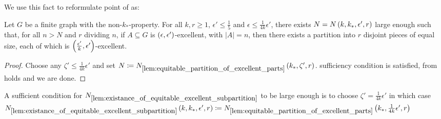     We use this fact to reformulate point  of
     as:

    \begin{lemma}[Claim 5.13.2(3)] \label{lem:existance_of_equitable_excellent_subpartition}
        Let $G$ be a finite graph with the non-$k_*$-property.
        For all $k, r \geq 1$, $\epsilon' \leq \frac{1}{5}$ and $\epsilon \leq \frac{1}{4k} \epsilon'$, there exists
        $N = N\left( k, k_*, \epsilon', r \right)$ large enough such that, for all $n > N$ and $r$ dividing $n$,
        if $A \subseteq G$ is $\left( \epsilon, \epsilon' \right)$-excellent, with $|A| = n$, then there exists a
        partition into $r$ disjoint pieces of equal size, each of which is $\left( \frac{\epsilon'}{k}, \epsilon' \right)$-excellent.
        \begin{proof}
            Choose any $\zeta' \leq \frac{1}{4k} \epsilon'$ and set $N \coloneq N_{\ref{lem:equitable_partition_of_excellent_parts}}\left( k_*, \zeta', r \right)$.
             sufficiency condition is satisfied,
             from 
            holds and we are done.
        \end{proof}
    \end{lemma}

    \begin{remark}
        A sufficient condition for $N_{\ref{lem:existance_of_equitable_excellent_subpartition}}$ to be large enough is
        to choose $\zeta' = \frac{1}{4k} \epsilon'$ in which case
        $N_{\ref{lem:existance_of_equitable_excellent_subpartition}}\left( k, k_*, \epsilon', r \right) \coloneq
        N_{\ref{lem:equitable_partition_of_excellent_parts}}\left( k_*, \frac{1}{4k} \epsilon', r \right)$
    \end{remark}

